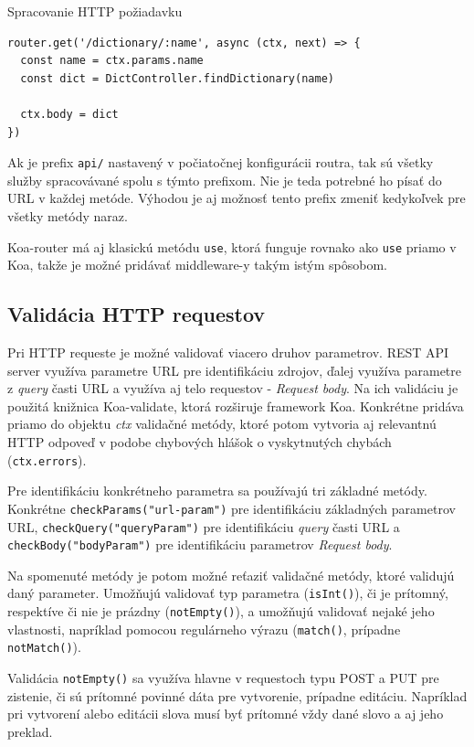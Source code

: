 \documentclass[
  digital, %
  table,   %
  lof,     %
  lot,     %
]{fithesis3}
\begin{document}
\begin{exmp}
Spracovanie HTTP požiadavku
\centering
\begin{lstlisting}[basicstyle=\small]
router.get('/dictionary/:name', async (ctx, next) => {
  const name = ctx.params.name
  const dict = DictController.findDictionary(name)
  
  ctx.body = dict
})
\end{lstlisting}
\end{exmp}

Ak je prefix \texttt{api/} nastavený v počiatočnej konfigurácii routra, tak sú všetky služby spracovávané spolu s týmto prefixom. Nie je teda potrebné ho písať do URL v každej metóde. Výhodou je aj možnosť tento prefix zmeniť kedykoľvek pre všetky metódy naraz.

Koa-router má aj klasickú metódu \texttt{use}, ktorá funguje rovnako ako \texttt{use} priamo v Koa, takže je možné pridávať middleware-y takým istým spôsobom.

\subsection{Validácia HTTP requestov}
Pri HTTP requeste je možné validovať viacero druhov parametrov. REST API server využíva parametre URL pre identifikáciu zdrojov, ďalej využíva parametre z \textit{query} časti URL a využíva aj telo requestov - \textit{Request body}. Na ich validáciu je použitá knižnica Koa-validate, ktorá rozširuje framework Koa. Konkrétne pridáva priamo do objektu \textit{ctx} validačné metódy, ktoré potom vytvoria aj relevantnú HTTP odpoveď v podobe chybových hlášok o vyskytnutých chybách (\texttt{ctx.errors}).

Pre identifikáciu konkrétneho parametra sa používajú tri základné metódy. Konkrétne \texttt{checkParams("url-param")} pre identifikáciu základných parametrov URL, \texttt{checkQuery("queryParam")} pre identifikáciu \textit{query} časti URL a \texttt{checkBody("bodyParam")} pre identifikáciu parametrov \textit{Request body}.

Na spomenuté metódy je potom možné reťaziť validačné metódy, ktoré validujú daný parameter. Umožňujú validovať typ parametra (\texttt{isInt()}), či je prítomný, respektíve či nie je prázdny (\texttt{notEmpty()}), a umožňujú validovať nejaké jeho vlastnosti, napríklad pomocou regulárneho výrazu (\texttt{match()}, prípadne \texttt{notMatch()}).

Validácia \texttt{notEmpty()} sa využíva hlavne v requestoch typu POST a PUT pre zistenie, či sú prítomné povinné dáta pre vytvorenie, prípadne editáciu. Napríklad pri vytvorení alebo editácii slova musí byť prítomné vždy dané slovo a aj jeho preklad. 
\end{document}
